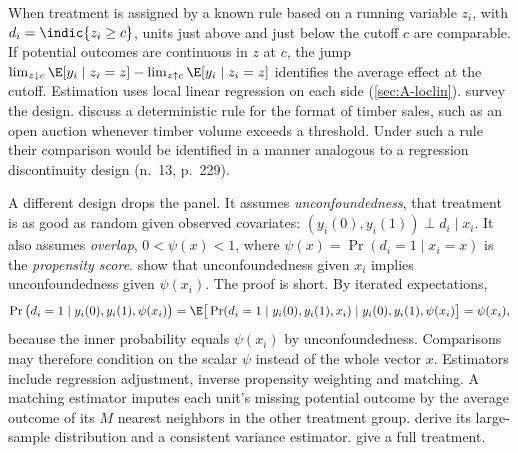 When treatment is assigned by a known rule based on a running variable $z_i$, with $d_i=\indic\{z_i\ge c\}$, units
just above and just below the cutoff $c$ are comparable. If potential outcomes are continuous in $z$ at $c$, the
jump $\lim_{z\downarrow c}\E[y_i\mid z_i=z]-\lim_{z\uparrow c}\E[y_i\mid z_i=z]$ identifies the average effect at
the cutoff. Estimation uses local linear regression on each side (\cref{sec:A-loclin}). \citet{LeeLemieux2010} survey
the design. \citet{AtheyLevinSeira2011} discuss a deterministic rule for the format of timber sales, such as an open
auction whenever timber volume exceeds a threshold. Under such a rule their comparison would be identified in a
manner analogous to a regression discontinuity design (n.~13, p.~229).

A different design drops the panel. It assumes \emph{unconfoundedness}, that treatment is as good as random given
observed covariates: $(y_i(0),y_i(1))\perp d_i\mid x_i$. It also assumes \emph{overlap}, $0<\psi(x)<1$, where
$\psi(x)=\Pr(d_i=1\mid x_i=x)$ is the \emph{propensity score}. \citet{RosenbaumRubin1983} show that unconfoundedness given
$x_i$ implies unconfoundedness given $\psi(x_i)$. The proof is short. By iterated expectations,
\begin{equation*}
\Pr\big(d_i=1\mid y_i(0),y_i(1),\psi(x_i)\big)=\E\big[\Pr(d_i=1\mid y_i(0),y_i(1),x_i)\mid y_i(0),y_i(1),\psi(x_i)\big]=\psi(x_i),
\end{equation*}
because the inner probability equals $\psi(x_i)$ by unconfoundedness. Comparisons may therefore condition on the
scalar $\psi$ instead of the whole vector $x$. Estimators include regression adjustment, inverse propensity
weighting and matching. A matching estimator imputes each unit's missing potential outcome by the average outcome of
its $M$ nearest neighbors in the other treatment group. \citet{AbadieImbens2006} derive its large-sample distribution
and a consistent variance estimator. \citet{ImbensRubin2015} give a full treatment.

